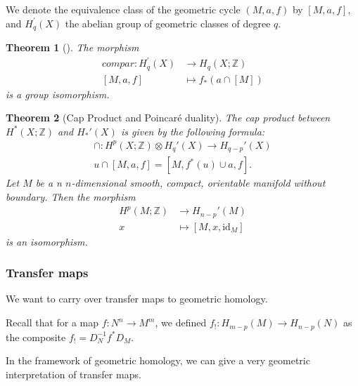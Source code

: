 \documentclass[reqno]{amsart}
\newtheorem{theorem}{Theorem}[section]
\theoremstyle{definition}
\theoremstyle{remark}
\newcommand{\id}{{\mathrm{id}}}
\begin{document}
We denote the equivalence class of the geometric cycle
$\left( M, a,f \right) $ by $\left[ M, a, f \right] $, and
$H_q^{'}(X)$ the abelian group of geometric classes
of degree $q$.

\begin{theorem}[]\cite[Corollary 2.3.6]{Martin1}
    The morphism
    \begin{align*}
        compar \colon H_q^{'} (X) 
        &\to H_q(X;\mathbb{Z})\\
        \left[ M,a,f \right] 
        &\mapsto f_* \left( a \cap \left[ M \right]  \right) 
    \end{align*}
    is a group isomorphism.
\end{theorem}

\begin{theorem}[Cap Product and Poincaré duality]\cite[§3.2, cites M. Jakob]{Chataur}
    The cap product between $H^{*}(X;\mathbb{Z})$ and
    $H_*'(X)$ is given by the following formula:
    \begin{align*}
        \cap \colon H^{p}(X;\mathbb{Z}) \otimes
        H_q'(X) \to H_{q-p}'(X)\\
        u \cap \left[ M,a,f \right] = 
        \left[ M, f^{*}(u) \cup a, f \right] .
    \end{align*}
    Let $M$ be a n $n$-dimensional smooth, compact, orientable manifold
    without boundary. Then the morphism
    \begin{align*}
        H^{p}(M; \mathbb{Z}) 
        &\to H_{n-p}'(M)\\
        x
        &\mapsto \left[ M, x, \id_M \right] 
    \end{align*}
    is an isomorphism.
\end{theorem}


\subsubsection{Transfer maps}

We want to carry over transfer maps to geometric homology.

Recall that for a map
$f \colon N^{n} \to M^{m}$, we defined
$f_! \colon H_{m-p}(M) \to H_{n-p}(N)$ as the composite
$f_! = D_N^{-1} f^{*} D_M$.

In the framework of geometric homology, we can
give a very geometric interpretation of transfer maps.
\end{document}
